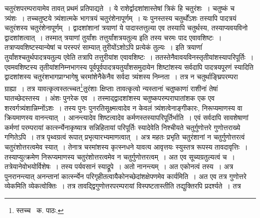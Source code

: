 \documentclass[11pt, openany]{book}
\begin{document}
\noindent चतुरंशपरम्परायामेव तावत् प्रथमं प्रतिपाद्यते~। ये राशेर्द्वादशांशास्तेषां त्रिकं हि चतुरंशः~। चतुष्कं च त्र्यंशः~। तच्चतुष्टये त्र्यंशात्मके
भागत्रयं चतुरंशेनापूर्णम्~। यः पुनस्तस्य चतुर्थोंऽशः तस्यापि पादत्रयं चतुरंशस्य चतुरंशेनापूर्णम्~। द्वादशांशानां त्रयाणां ये पादास्तत्तुल्या एव तस्यापि
चतुर्थस्य, तस्याप्यवयविनो द्वादशांशत्वात्~। तस्मात् त्रयाणां तुर्यांशः तत्तुर्यांशत्रयतुल्य इति तस्य चरमः पाद एवावशिष्टः~। तत्राप्यवशिष्टस्यान्येषां च परस्परं साम्यात् तुरीयोंऽशोऽपि प्रत्येकं तुल्यः~। इति त्रयाणांं तुर्यांशश्चतुर्थपादत्रयतुल्य एवेति तत्रापि तत्तुरीयांश एवावशिष्टः~। ततस्तेनैवावयविनस्तृतीयांशस्यापरिपूर्तिः~। एवमवशिष्टस्य तृतीयांशनिम्नभागस्य पूर्वपूर्वपादत्रयतुर्यांशसमुदायेन शिष्टांशस्य सर्वदापि
पादत्रयपूरणं स्यादिति द्वादशांशस्य चतुरंशभागप्राग्भागेषु चरमांशेनैकेनैव सर्वदा त्र्यंशस्य निम्नता~। तत्र न चतुर्थाङ्घ्रिपरम्परा ग्राह्या~। तत्र
यावत्कृत्वस्तत्च्चत\renewcommand{\thefootnote}{१}\footnote{स्तच्च \textendash\ क. पाठः.}तुरंशाः क्षिप्ताः तावत्कृत्वो न्यस्तानां चतुष्काणां राशीनां तेषां घातच्छेदस्तस्य~। अंशः पुनरेक एव~। तस्माद्द्वादशांशस्य चतुष्कपरम्पराघातांशक एक एव शरवर्गत्र्यंशान्निम्नोंऽशः~। तस्य पुनः पुनरतिसूक्ष्मत्वादेव न केवलं त्र्यंशत्वेनाङ्गीकारः, निरूप्यमाणस्य वा क्रियमाणस्य वानन्त्यात्~। आनन्त्यादेव शिष्टत्वादेव कर्मणस्तस्यापरिपूर्तिर्भाति~। एवं सर्वदापि सावशेषाणां कर्मणां परम्परायां कार्त्स्न्येनाकृष्यात्र सन्निहितायां परिपूर्तिः स्यादेवेति निश्चीयते चतुर्गुणोत्तरे गुणोत्तराख्ये गणितेऽपि~। तत्र पृथ्वग्रत्वं रूपात् प्रभृत्यारभ्यमाणत्वात्~। अत्र महतः प्रभृति चतुरंशानां न
चतुर्गुणोत्तरत्वं चतुरंशोत्तरत्वमेव स्यात्~। तेनात्र चरमांशस्य कृत्स्नधने यावत्य आवृत्तयः स्युस्तत्र रूपस्य तावदावृत्तिः~। तस्याप्युत्क्रमेण निरूप्यमाणस्य चतुरंशोत्तरत्वमेव न चतुर्गुणोत्तरत्वम्~। अत एव सूच्यग्रतुल्यत्वं च~। तत्रेयानेवोभयोर्विशेषः~। तस्य पर्यवसानं स्याद्रूपे~। अतो नानन्त्यम्~। अत एकोनत्वं तस्य~। अत्र पुनरानन्त्यात् अनन्तानां कार्त्स्न्येन परिगृहीतत्वायैकोनच्छेदांशक्षेपणमेव कार्यमिति~। अत एव तत्र गुणोत्तरे व्येकमिति व्येकत्वोक्तिः~। तत्र तावद्द्विगुणोत्तरपरम्परायां विस्पष्टतास्तीति तद्युक्तिरपि प्रदर्श्यते~। तत्र

\newpage
\end{document}

